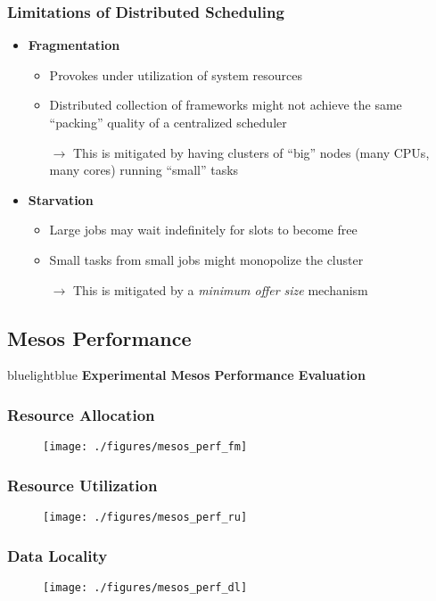 \begin{frame}
\frametitle{Limitations of Distributed Scheduling}
\begin{itemize}
	\item {\bf Fragmentation}
	\begin{itemize}
		\item Provokes under utilization of system resources
		\item Distributed collection of frameworks might not achieve the same ``packing'' quality of a centralized scheduler
		\item[$\to$] This is mitigated by having clusters of ``big'' nodes (many CPUs, many cores) running ``small'' tasks
	\end{itemize}

\vspace{20pt}

	\item {\bf Starvation}
	\begin{itemize}
		\item Large jobs may wait indefinitely for slots to become free
		\item Small tasks from small jobs might monopolize the cluster
		\item[$\to$] This is mitigated by a {\it minimum offer size} mechanism
	\end{itemize}
\end{itemize}
\end{frame}

\subsection{Mesos Performance}
\begin{frame}
 \begin{colorblock}{blue}{lightblue}{ }
    \Large \textbf{Experimental Mesos Performance Evaluation}
  \end{colorblock}
\end{frame}

\begin{frame}
\frametitle{Resource Allocation}
\begin{figure}[h]
  \centering
  \texttt{[image: ./figures/mesos\_perf\_fm]}
  \label{fig:mesos_perf_ru}
\end{figure}
\end{frame}

\begin{frame}
\frametitle{Resource Utilization}
\begin{figure}[h]
  \centering
  \texttt{[image: ./figures/mesos\_perf\_ru]}
  \label{fig:mesos_perf_ru}
\end{figure}
\end{frame}

\begin{frame}
\frametitle{Data Locality}
\begin{figure}[h]
  \centering
  \texttt{[image: ./figures/mesos\_perf\_dl]}
  \label{fig:mesos_perf_dl}
\end{figure}
\end{frame}
